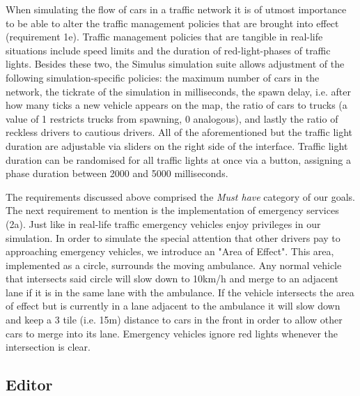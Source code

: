 When simulating the flow of cars in a traffic network it is of utmost importance to be able to alter the traffic management policies that are brought into effect (requirement 1e). Traffic management policies that are tangible in real-life situations include speed limits and the duration of red-light-phases of traffic lights. Besides these two, the Simulus simulation suite allows adjustment of the following simulation-specific policies: the maximum number of cars in the network, the tickrate of the simulation in milliseconds, the spawn delay, i.e. after how many ticks a new vehicle appears on the map, the ratio of cars to trucks (a value of 1 restricts trucks from spawning, 0 analogous), and lastly the ratio of reckless drivers to cautious drivers. All of the aforementioned but the traffic light duration are adjustable via sliders on the right side of the interface. Traffic light duration can be randomised for all traffic lights at once via a button, assigning a phase duration between 2000 and 5000 milliseconds.

The requirements discussed above comprised the \textit{Must have} category of our goals. The next requirement to mention is the implementation of emergency services (2a). Just like in real-life traffic emergency vehicles enjoy privileges in our simulation. In order to simulate the special attention that other drivers pay to approaching emergency vehicles, we introduce an "Area of Effect". This area, implemented as a circle, surrounds the moving ambulance. Any normal vehicle that intersects said circle will slow down to 10km/h and merge to an adjacent lane if it is in the same lane with the ambulance. If the vehicle intersects the area of effect but is currently in a lane adjacent to the ambulance it will slow down and keep a 3 tile (i.e. 15m) distance to cars in the front in order to allow other cars to merge into its lane. Emergency vehicles ignore red lights whenever the intersection is clear.


\subsection{Editor}\label{ss:req-editor}
